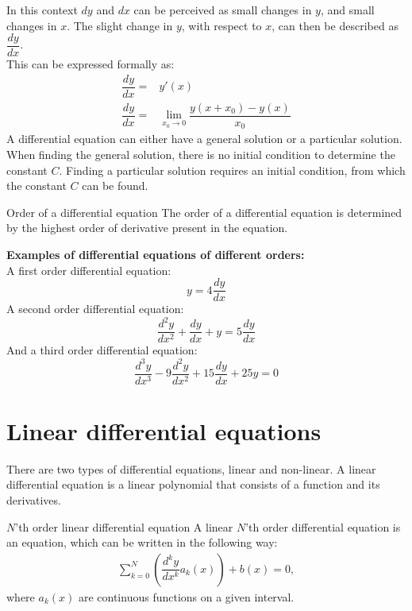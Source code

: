 In this context $dy$ and $dx$ can be perceived as small changes in $y$, and small changes in $x$. The slight change in $y$, with respect to $x$, can then be described as $\dfrac{dy}{dx}$.
\\
This can be expressed formally as:
\\
\begin{align*}
	\dfrac{dy}{dx} =& y'(x) \\
	\dfrac{dy}{dx} =& \lim_{x_0\to 0} \dfrac{y(x+x_0)-y(x)}{x_0}
\end{align*}
A differential equation can either have a general solution or a particular solution. When finding the general solution, there is no initial condition to determine the constant $C$. Finding a particular solution requires an initial condition, from which the constant $C$ can be found.

\clearpage

\begin{definition}{Order of a differential equation}{}
The order of a differential equation is determined by the highest order of derivative present in the equation.
\end{definition} 

\noindent
\textbf{Examples of differential equations of different orders:}
\\
A first order differential equation:
$$y=4\frac{dy}{dx} $$
A second order differential equation:
$$\frac{d^2y}{dx^2}+\frac{dy}{dx}+y = 5\frac{dy}{dx}$$
And a third order differential equation:
$$\frac{d^3y}{dx^3} - 9\frac{d^2y}{dx^2} + 15\frac{dy}{dx} + 25y = 0$$

\section{Linear differential equations}
There are two types of differential equations, linear and non-linear. A linear differential equation is a linear polynomial that consists of a function and its derivatives.
\begin{definition}{$N$'th order linear differential equation}{}
A linear $N$'th order differential equation is an equation, which can be written in the following way:
\begin{align*}
\sum_{k=0}^{N}\left(\dfrac{d^ky}{dx^k}a_k(x)\right)+b(x)=0,
\end{align*}
where $a_k(x)$ are continuous functions on a given interval.
\end{definition}
